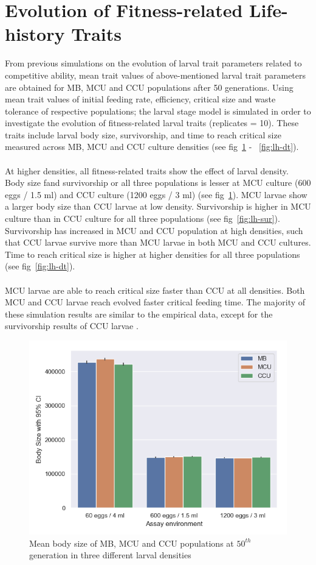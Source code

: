 \section{Evolution of Fitness-related Life-history Traits}
From previous simulations on the evolution of larval trait parameters related to competitive ability, mean trait values of above-mentioned larval trait parameters are obtained for MB, MCU and CCU populations after 50 generations. Using mean trait values of initial feeding rate, efficiency, critical size and waste tolerance of respective populations; the larval stage model is simulated in order to investigate the evolution of fitness-related larval traits (replicates = 10). These traits include larval body size, survivorship, and time to reach critical size measured across MB, MCU and CCU culture densities (see fig~\ref{fig:lh-bs} - ~\ref{fig:lh-dt}).\\\\
At higher densities, all fitness-related traits show the effect of larval density. Body size fand survivorship or all three populations is lesser at MCU culture (600 eggs / 1.5 ml) and CCU culture (1200 eggs / 3 ml) (see fig~\ref{fig:lh-bs}). MCU larvae show a larger body size than CCU larvae at low density. Survivorship is higher in MCU culture than in CCU culture for all three populations (see fig~\ref{fig:lh-sur}). Survivorship has increased in MCU and CCU population at high densities, such that CCU larvae survive more than MCU larvae in both MCU and CCU cultures. Time to reach critical size is higher at higher densities for all three populations (see fig~\ref{fig:lh-dt}).\\\\
MCU larvae are able to reach critical size faster than CCU at all densities. Both MCU and CCU larvae reach evolved faster critical feeding time. The majority of these simulation results are similar to the empirical data, except for the survivorship results of CCU larvae \citep{sarangiEcologicalDetailsMediate2018}.
\begin{figure}[h]
  \centering
  \includegraphics[width=.75\textwidth]{C4/Figs/larval_alive_sizec4}
  \caption{Mean body size of MB, MCU and CCU populations at $50^{th}$ generation in three different larval densities}
  \label{fig:lh-bs}
\end{figure}
